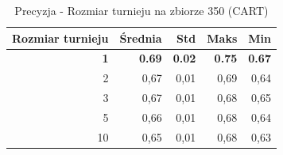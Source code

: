 \begin{table}[htbp]
\centering
\small
\setlength{\tabcolsep}{6pt}
\renewcommand{\arraystretch}{1.2}
\caption{Precyzja - Rozmiar turnieju na zbiorze 350 (CART)}
\label{tab:CART_tournament_size_350_precision}
\begin{tabular}{r|r|r|r|r}
\toprule
Rozmiar turnieju & Średnia & Std & Maks & Min \\
\hline
\textbf{1} & \textbf{0.69} & \textbf{0.02} & \textbf{0.75} & \textbf{0.67} \\
2 & 0,67 & 0,01 & 0,69 & 0,64 \\
3 & 0,67 & 0,01 & 0,68 & 0,65 \\
5 & 0,66 & 0,01 & 0,68 & 0,64 \\
10 & 0,65 & 0,01 & 0,68 & 0,63 \\
\bottomrule
\end{tabular}
\end{table}